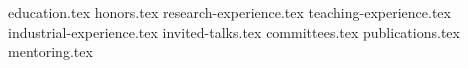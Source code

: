 \documentclass[11pt, a4paper]{awesome-cv}
\newcommand*{\sectiondir}{resume/}
\begin{document}
	
	
	
	
\makecvheader

{education.tex}
{honors.tex}
{research-experience.tex}
{teaching-experience.tex}
{industrial-experience.tex}
{invited-talks.tex}
{committees.tex}
{publications.tex}
{mentoring.tex}
\end{document}

